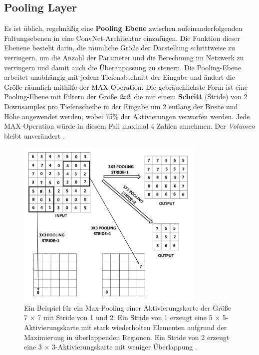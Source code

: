 \subsection{Pooling Layer}
Es ist üblich, regelmäßig eine \textbf{Pooling Ebene} zwischen aufeinanderfolgenden Faltungsebenen in eine ConvNet-Architektur einzufügen. Die Funktion dieser Ebenene besteht darin, die räumliche Größe der Darstellung schrittweise zu verringern, um die Anzahl der Parameter und die Berechnung im Netzwerk zu verringern und damit auch die Überanpassung zu steuern. Die Pooling-Ebene arbeitet unabhängig mit jedem Tiefenabschnitt der Eingabe und ändert die Größe räumlich mithilfe der MAX-Operation. Die gebräuchlichste Form ist eine Pooling-Ebene mit Filtern der Größe \textit{2x2}, die mit einem\textbf{ Schritt} (Stride) von 2 Downsamples pro Tiefenscheibe in der Eingabe um 2 entlang der Breite und Höhe angewendet werden, wobei 75\% der Aktivierungen verworfen werden. Jede MAX-Operation würde in diesem Fall maximal 4 Zahlen annehmen. Der \textit{Volumen} bleibt unverändert \cite*{StanfordUniversityCoursecs231n2018a}.

\begin{figure}[H]
    \centering
    \includegraphics[width=9cm]{kapitel2/maxpooling.png}
    \caption[Max-Pooling]{Ein Beispiel für ein Max-Pooling einer Aktivierungskarte der Größe 7 × 7 mit Stride von 1 und 2. Ein Stride von 1 erzeugt eine 5 × 5-Aktivierungskarte mit stark wiederholten Elementen aufgrund der Maximierung in überlappenden Regionen. Ein Stride von 2 erzeugt eine 3 × 3-Aktivierungskarte mit weniger Überlappung \cite*[326]{Aggarwal2018}.}
    \label{Kap2:Pooling}
\end{figure}


